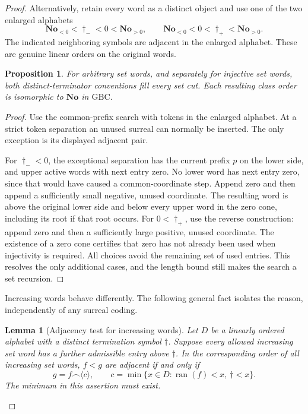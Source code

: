 \documentclass[11pt]{article}
\newtheorem{lemma}[lemma]{Lemma}
\newtheorem{proposition}[proposition]{Proposition}
\theoremstyle{definition}
\theoremstyle{remark}
\newcommand{\No}{\mathbf{No}}
\begin{document}
\begin{proof}
Alternatively, retain every word as a distinct object and use one
of the two enlarged alphabets
\[
 \No_{<0}<\dagger_-<0<\No_{>0},\qquad
 \No_{<0}<0<\dagger_+<\No_{>0}.
\]
The indicated neighboring symbols are adjacent in the enlarged
alphabet.  These are genuine linear orders on the original words.

\begin{proposition}
\label{swo:sh:wv:adjacent-terminator-all}
For arbitrary set words, and separately for injective set words,
both distinct-terminator conventions fill every set cut.  Each
resulting class order is isomorphic to \(\No\) in \(\mathrm{GBC}\).
\end{proposition}

\begin{proof}
Use the common-prefix search with tokens in the enlarged alphabet.
At a strict token separation an unused surreal can normally be
inserted.  The only exception is its displayed adjacent pair.

For \(\dagger_-<0\), the exceptional separation has the current
prefix \(p\) on the lower side, and upper active words with next
entry zero.  No lower word has next entry zero, since that would
have caused a common-coordinate step.  Append zero and then append
a sufficiently small negative, unused coordinate.  The resulting
word is above the original lower side and below every upper word
in the zero cone, including its root if that root occurs.
For \(0<\dagger_+\), use the reverse construction: append zero and
then a sufficiently large positive, unused coordinate.
The existence of a zero cone certifies that zero has not already
been used when injectivity is required.  All choices avoid the
remaining set of used entries.  This resolves the only additional
cases, and the length bound still makes the search a set recursion.
\end{proof}

Increasing words behave differently.  The following general fact
isolates the reason, independently of any surreal coding.

\begin{lemma}[Adjacency test for increasing words]
\label{swo:sh:wv:adjacency-test}
Let \(D\) be a linearly ordered alphabet with a distinct termination
symbol \(\dagger\).  Suppose every allowed increasing set word has
a further admissible entry above \(\dagger\).  In the corresponding
order of all increasing set words, \(f<g\) are adjacent if and only if
\[
 g=f\mathbin{\frown}\langle c\rangle,
 \qquad
 c=\min\{x\in D:\operatorname{ran}(f)<x,\ \dagger<x\}.
\]
The minimum in this assertion must exist.
\end{lemma}


\end{proof}
\end{document}
